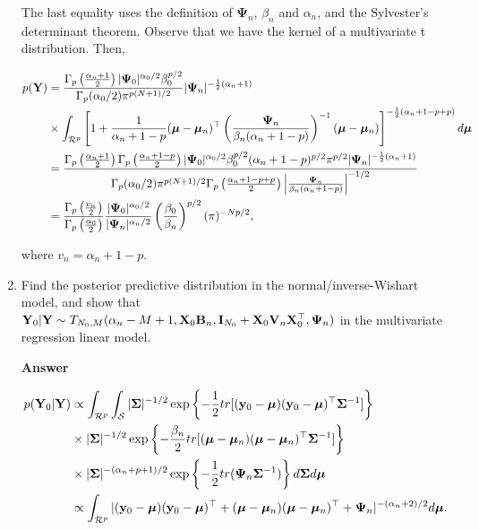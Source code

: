 \begin{enumerate}[leftmargin=*]
The last equality uses the definition of $\mathbf{\Psi}_n$, $\beta_n$ and $\alpha_n$, and the Sylvester's determinant theorem. Observe that we have the kernel of a multivariate t distribution. Then,

\begin{align*}
	p({\bf{Y}})	&=\frac{\Gamma_p\left(\frac{\alpha_n+1}{2}\right)|\mathbf{\Psi}_0|^{\alpha_0/2}\beta_0^{p/2}}{\Gamma_p(\alpha_0/2)\pi^{p(N+1)/2}}|\mathbf{\Psi}_n|^{-\frac{1}{2}(\alpha_n+1)}\\
	&\times\int_{\mathcal{R}^p} \left[ 1+\frac{1}{\alpha_n+1-p}(\bm{\mu}-\bm{\mu}_n)^{\top}\left(\frac{\mathbf{\Psi}_n}{\beta_n(\alpha_n+1-p)}\right)^{-1}(\bm{\mu}-\bm{\mu}_n)\right]^{-\frac{1}{2}(\alpha_n+1-p+p)} d\bm{\mu}\\
	&=\frac{\Gamma_p\left(\frac{\alpha_n+1}{2}\right)\Gamma_p\left(\frac{\alpha_n+1-p}{2}\right)|\mathbf{\Psi}_0|^{\alpha_0/2}\beta_0^{p/2}(\alpha_n+1-p)^{p/2}\pi^{p/2}|\mathbf{\Psi}_n|^{-\frac{1}{2}(\alpha_n+1)}}{\Gamma_p(\alpha_0/2)\pi^{p(N+1)/2}\Gamma_p\left(\frac{\alpha_n+1-p+p}{2}\right)\left|\frac{\mathbf{\Psi}_n}{\beta_n(\alpha_n+1-p)}\right|^{-1/2}}\\
	&=\frac{\Gamma_p\left(\frac{v_n}{2}\right)}{\Gamma_p\left(\frac{\alpha_0}{2}\right)}\frac{|\mathbf{\Psi}_0|^{\alpha_0/2}}{|\mathbf{\Psi}_n|^{\alpha_n/2}}\left(\frac{\beta_0}{\beta_n}\right)^{p/2}(\pi)^{-Np/2},
\end{align*}

where $v_n=\alpha_n+1-p$.


\item Find the posterior predictive distribution in the normal/inverse-Wishart model, and show that ${\bf{Y}}_0|{\bf{Y}}\sim T_{N_0,M}(\alpha_n-M+1,{\bf{X}}_0{\bf{B}}_n,{\bf{I}}_{N_0}+{\bf{X}}_0{\bf{V}}_n{\bf{X}}_0^{\top},{\bf{\Psi}}_n)$ in the multivariate regression linear model.

\textbf{Answer}

\begin{align*}
	p({\bf{Y}}_0|{\bf{Y}})&\propto\int_{\mathcal{R}^p}\int_{\mathcal{S}}|\mathbf{\Sigma}|^{-1/2}\exp\left\{-\frac{1}{2}tr[({\bf{y}}_0-\bm{\mu})({\bf{y}}_0-\bm{\mu})^{\top}\mathbf{\Sigma}^{-1}]\right\}\\
	&\times |\mathbf{\Sigma}|^{-1/2}\exp\left\{-\frac{\beta_n}{2}tr[(\bm{\mu}-\bm{\mu}_n)(\bm{\mu}-\bm{\mu}_n)^{\top}\mathbf{\Sigma}^{-1}]\right\}\\
	&\times |\mathbf{\Sigma}|^{-(\alpha_n+p+1)/2}\exp\left\{-\frac{1}{2}tr(\mathbf{\Psi}_n \mathbf{\Sigma}^{-1})\right\}d\mathbf{\Sigma} d\bm{\mu}\\
	&\propto\int_{\mathcal{R}^p}|({\bf{y}}_0-\bm{\mu})({\bf{y}}_0-\bm{\mu})^{\top}+(\bm{\mu}-\bm{\mu}_n)(\bm{\mu}-\bm{\mu}_n)^{\top}+\mathbf{\Psi}_n|^{-(\alpha_n+2)/2}d\bm{\mu}.
\end{align*}


\end{enumerate}
